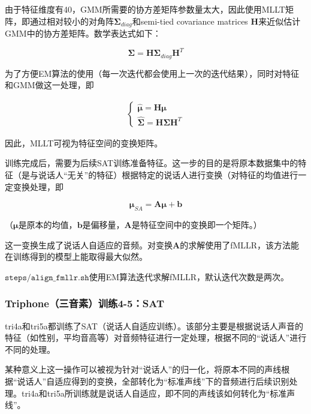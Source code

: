 \documentclass[a4paper]{article}
\renewcommand{\tt}[1]{\mathtt{#1}}
\newcommand{\bd}[1]{\boldsymbol{#1}}
\begin{document}
\begin{itemize}
    由于特征维度有40，GMM所需要的协方差矩阵参数量太大，因此使用MLLT矩阵，即通过相对较小的对角阵$\bd{\Sigma}_{diag}$和semi-tied covariance matrices $\bd{H}$来近似估计GMM中的协方差矩阵。数学表达式如下：
    
    \vspace{-1em}
    $$\bd{\Sigma}=\bd{H}\bd{\Sigma}_{diag}\bd{H}^T$$
    
    为了方便EM算法的使用（每一次迭代都会使用上一次的迭代结果），同时对特征和GMM做这一处理，即
    
    \vspace{-2em}
    \begin{align*}
        \left\{
        \begin{array}{l}
            \hat{\bd{\mu}} = \bd{H}\bd{\mu}  \\
            \hat{\bd{\Sigma}}=\bd{H}\bd{\Sigma}\bd{H}^T
        \end{array}
        \right.
    \end{align*}
    
    因此，MLLT可视为特征空间的变换矩阵。
\end{itemize}

\vspace{1em}
训练完成后，需要为后续SAT训练准备特征。这一步的目的是将原本数据集中的特征（是与说话人“无关”的特征）根据特定的说话人进行变换（对特征的均值进行一定变换处理，即

\vspace{-1em}
$$\bd{\mu}_{SA}=\bd{A}\bd{\mu}+\bd{b}$$

（$\bd{\mu}$是原本的均值，$\bd{b}$是偏移量，$\bd{A}$是特征空间中的变换即一个矩阵。）

这一变换生成了说话人自适应的音频。对变换$\bd{A}$的求解使用了fMLLR，该方法能在训练得到的模型上能取得最大似然。\cite{LDA}

$\tt{steps/align\_fmllr.sh}$使用EM算法迭代求解fMLLR，默认迭代次数是两次。



\vspace{1em}
\subsubsection{Triphone（三音素）训练4-5：SAT}

tri4a和tri5a都训练了SAT（说话人自适应训练）。该部分主要是根据说话人声音的特征（如性别，平均音高等）对音频特征进行一定处理，根据不同的“说话人”进行不同的处理。

某种意义上这一操作可以被视为针对“说话人”的归一化，将原本不同的声线根据“说话人”自适应得到的变换，全部转化为“标准声线”下的音频进行后续识别处理。tri4a和tri5a所训练就是说话人自适应，即不同的声线该如何转化为“标准声线”。
\end{document}
